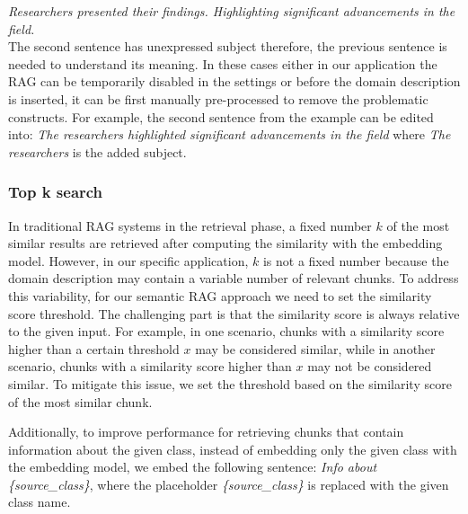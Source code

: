 \noindent{}\textit{Researchers presented their findings. Highlighting significant advancements in the field.} \\

\noindent{}The second sentence has unexpressed subject therefore, the previous sentence is needed to understand its meaning. In these cases either in our application the RAG can be temporarily disabled in the settings or before the domain description is inserted, it can be first manually pre-processed to remove the problematic constructs. For example, the second sentence from the example can be edited into: \textit{The researchers highlighted significant advancements in the field} where \textit{The researchers} is the added subject.


\subsubsection{Top k search}
\label{sec:top_k_search}

In traditional RAG systems in the retrieval phase, a fixed number $k$ of the most similar results are retrieved after computing the similarity with the embedding model. However, in our specific application, $k$ is not a fixed number because the domain description may contain a variable number of relevant chunks. To address this variability, for our semantic RAG approach we need to set the similarity score threshold. The challenging part is that the similarity score is always relative to the given input. For example, in one scenario, chunks with a similarity score higher than a certain threshold $x$ may be considered similar, while in another scenario, chunks with a similarity score higher than $x$ may not be considered similar. To mitigate this issue, we set the threshold based on the similarity score of the most similar chunk.

Additionally, to improve performance for retrieving chunks that contain information about the given class, instead of embedding only the given class with the embedding model, we embed the following sentence: \textit{Info about \{source\_class\}}, where the placeholder \textit{\{source\_class\}} is replaced with the given class name.

